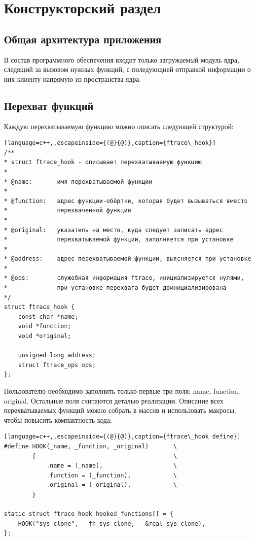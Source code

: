 \chapter{Конструкторский раздел}
\label{cha:design}

\section{Общая архитектура приложения}
В состав программного обеспечения входит только загружаемый модуль ядра, следящий за вызовом нужных функций, с поледующией отправкой информации о них клиенту напрямую из пространства ядра.

\section{Перехват функций}

Каждую перехватываемую функцию можно описать следующей структурой:
\begin{lstlisting}[language=c++,,escapeinside={(@}{@)},caption={ftrace\_hook}]
/**
* struct ftrace_hook - описывает перехватываемую функцию
*
* @name:       имя перехватываемой функции
*
* @function:   адрес функции-обёртки, которая будет вызываться вместо
*              перехваченной функции
*
* @original:   указатель на место, куда следует записать адрес
*              перехватываемой функции, заполняется при установке
*
* @address:    адрес перехватываемой функции, выясняется при установке
*
* @ops:        служебная информация ftrace, инициализируется нулями,
*              при установке перехвата будет доинициализирована
*/
struct ftrace_hook {
	const char *name;
	void *function;
	void *original;

	unsigned long address;
	struct ftrace_ops ops;
};
\end{lstlisting}

Пользователю необходимо заполнить только первые три поля: name, function, original. Остальные поля считаются деталью реализации. Описание всех перехватываемых функций можно собрать в массив и использовать макросы, чтобы повысить компактность кода:

\newpage
\begin{lstlisting}[language=c++,,escapeinside={(@}{@)},caption={ftrace\_hook define}]
#define HOOK(_name, _function, _original)       \
		{                                       \
			.name = (_name),                    \
			.function = (_function),            \
			.original = (_original),            \
		}

static struct ftrace_hook hooked_functions[] = {
	HOOK("sys_clone",   fh_sys_clone,   &real_sys_clone),
};
\end{lstlisting}

